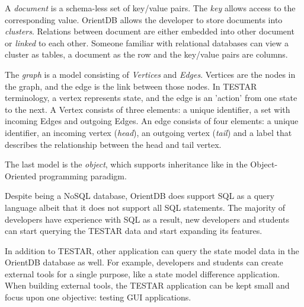 A \hypertarget{db:document}{\emph{document}} is a schema-less set of key/value pairs. The \emph{key} allows access to the corresponding value. OrientDB allows the developer to store documents into \emph{clusters}. Relations between document are either embedded into other document or \emph{linked} to each other. Someone familiar with relational databases can view a cluster as tables, a document as the row and the key/value pairs are columns.

The \hypertarget{db:graph}{\emph{graph}} is a model consisting of \emph{Vertices} and \emph{Edges}. Vertices are the nodes in the graph, and the edge is the link between those nodes. In TESTAR terminology, a vertex represents state, and the edge is an 'action' from one state to the next. A Vertex consists of three elements: a unique identifier, a set with incoming Edges and outgoing Edges. An edge consists of four elements: a unique identifier, an incoming vertex (\emph{head}), an outgoing vertex (\emph{tail}) and a label that describes the relationship between the head and tail vertex.\par

The last model is the \hypertarget{db:object}{\emph{object}}, which supports inheritance like in the Object-Oriented programming paradigm.\par

Despite being a NoSQL database, OrientDB does support SQL as a query language \cite{sql-lang} albeit that it does not support all SQL statements. The majority of developers have experience with SQL \cite{sql-stats} as a result, new developers and students can start querying the TESTAR data and start expanding its features.\par

In addition to TESTAR, other application can query the state model data in the OrientDB database as well. For example, developers and students can create external tools for a single purpose, like a state model difference application. When building external tools, the TESTAR application can be kept small and focus upon one objective: testing GUI applications. 